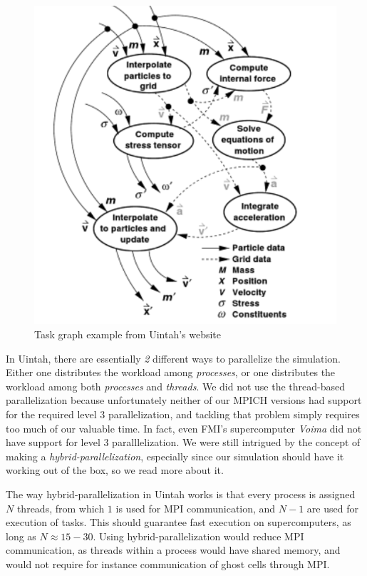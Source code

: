\documentclass[notitlepage, 12pt]{article}
\begin{document}
\begin{figure}[H]
 \centering
 \includegraphics[width=\textwidth]{Uintah/taskgraph.png}
 \caption{Task graph example from Uintah's website}
 \label{fig:uintah_taskgraph}
\end{figure}

In Uintah, there are essentially \emph{2} different ways to parallelize the simulation. Either one distributes the workload among \emph{processes}, or 
one distributes the workload among both \emph{processes} and \emph{threads}. We did not use the thread-based parallelization because unfortunately neither of 
our MPICH versions had support for the required level 3 parallelization, and tackling that problem simply requires too much of our valuable time. In fact, 
even FMI's supercomputer \emph{Voima} did not have support for level 3 paralllelization. We were still intrigued by the concept of making a \emph{hybrid-parallelization}, 
especially since our simulation should have it working out of the box, so we read more about it.

The way hybrid-parallelization in Uintah works is that every process is assigned $N$ threads, from which $1$ is used for MPI communication, and $N-1$ are 
used for execution of tasks. This should guarantee fast execution on supercomputers, as long as $N \approx 15-30$. Using hybrid-parallelization would 
reduce MPI communication, as threads within a process would have shared memory, and would not require for instance communication of ghost cells through 
MPI.
\end{document}
